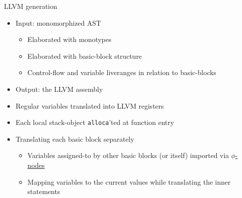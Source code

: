 \documentclass[aspectratio=169]{beamer}
\newcommand{\li}[1]{\lstinline{#1}}
\begin{document}
\begin{frame}{LLVM generation}
  \begin{itemize}
    \item[\faSignIn] Input: monomorphized AST
    \begin{itemize}
      \item Elaborated with monotypes
      \item Elaborated with basic-block structure
      \item Control-flow and variable liveranges in relation to basic-blocks
    \end{itemize} 
    \item[\faSignOut] Output: the LLVM assembly
    \item Regular variables translated into LLVM registers
    \item Each local stack-object \li{alloca}'ted at function entry
    \item Translating each basic block separately
    \begin{itemize}
      \item[\only<1,3>{\faChevronRight}\only<2>{\faChevronDown}] Variables assigned-to by other basic blocks (or itself) imported via \underline{$\phi$-nodes}
      \item[\only<1,2>{\faChevronRight}\only<3>{\faChevronDown}] Mapping variables to the current values while translating the inner statements
    \end{itemize}
  \end{itemize}
\end{frame}
\end{document}
